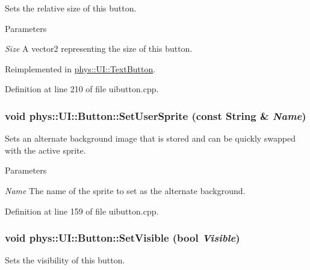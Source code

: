 Sets the relative size of this button. 


\begin{DoxyParams}{Parameters}
\item[{\em Size}]A vector2 representing the size of this button. \end{DoxyParams}


Reimplemented in \hyperlink{classphys_1_1UI_1_1TextButton_a7ed2a635d23906fcf1844e75018e20de}{phys::UI::TextButton}.



Definition at line 210 of file uibutton.cpp.

\hypertarget{classphys_1_1UI_1_1Button_a8c3a5657daf79a882f71691e91785d4d}{
\subsubsection[{SetUserSprite}]{\setlength{\rightskip}{0pt plus 5cm}void phys::UI::Button::SetUserSprite (const {\bf String} \& {\em Name})}}
\label{d8/d88/classphys_1_1UI_1_1Button_a8c3a5657daf79a882f71691e91785d4d}


Sets an alternate background image that is stored and can be quickly swapped with the active sprite. 


\begin{DoxyParams}{Parameters}
\item[{\em Name}]The name of the sprite to set as the alternate background. \end{DoxyParams}


Definition at line 159 of file uibutton.cpp.

\hypertarget{classphys_1_1UI_1_1Button_a293a0a5296778fb3d638c31c5d9d4c75}{
\subsubsection[{SetVisible}]{\setlength{\rightskip}{0pt plus 5cm}void phys::UI::Button::SetVisible (bool {\em Visible})}}
\label{d8/d88/classphys_1_1UI_1_1Button_a293a0a5296778fb3d638c31c5d9d4c75}


Sets the visibility of this button. 



